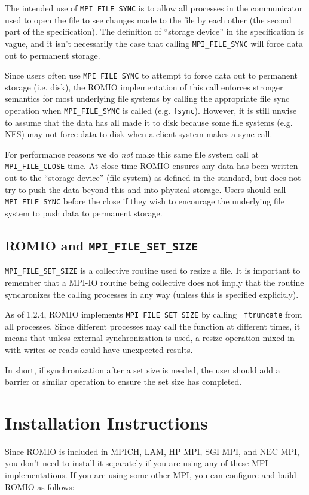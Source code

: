 The intended use of {\tt MPI\_FILE\_SYNC} is to allow all processes in the
communicator used to open the file to see changes made to the file by each
other (the second part of the specification).  The definition of ``storage
device'' in the specification is vague, and it isn't necessarily the case that
calling {\tt MPI\_FILE\_SYNC} will force data out to permanent storage.

Since users often use {\tt MPI\_FILE\_SYNC} to attempt to force data out to
permanent storage (i.e. disk), the ROMIO implementation of this call enforces
stronger semantics for most underlying file systems by calling the appropriate
file sync operation when {\tt MPI\_FILE\_SYNC} is called (e.g. {\tt fsync}).
However, it is still unwise to assume that the data has all made it to disk
because some file systems (e.g. NFS) may not force data to disk when a client
system makes a sync call.

For performance reasons we do \emph{not} make this same file system call at
{\tt MPI\_FILE\_CLOSE} time.  At close time ROMIO ensures any data has been
written out to the ``storage device'' (file system) as defined in the
standard, but does not try to push the data beyond this and into physical
storage. Users should call {\tt MPI\_FILE\_SYNC} before the close if they wish
to encourage the underlying file system to push data to permanent storage.

\subsection{ROMIO and {\tt MPI\_FILE\_SET\_SIZE}}

{\tt MPI\_FILE\_SET\_SIZE} is a collective routine used to resize a file.  It
is important to remember that a MPI-IO routine being collective does not imply
that the routine synchronizes the calling processes in any way (unless this is
specified explicitly).

As of 1.2.4, ROMIO implements {\tt MPI\_FILE\_SET\_SIZE} by calling {\tt
ftruncate} from all processes.  Since different processes may call the
function at different times, it means that unless external synchronization is
used, a resize operation mixed in with writes or reads could have unexpected
results.

In short, if synchronization after a set size is needed, the user should add a
barrier or similar operation to ensure the set size has completed.


%
%
\section{Installation Instructions}
Since ROMIO is included in MPICH, LAM, HP MPI, SGI MPI, and NEC MPI, you don't
need to install it separately if you are using any of these MPI
implementations.  If you are using some other MPI, you
can configure and build ROMIO as follows: 

